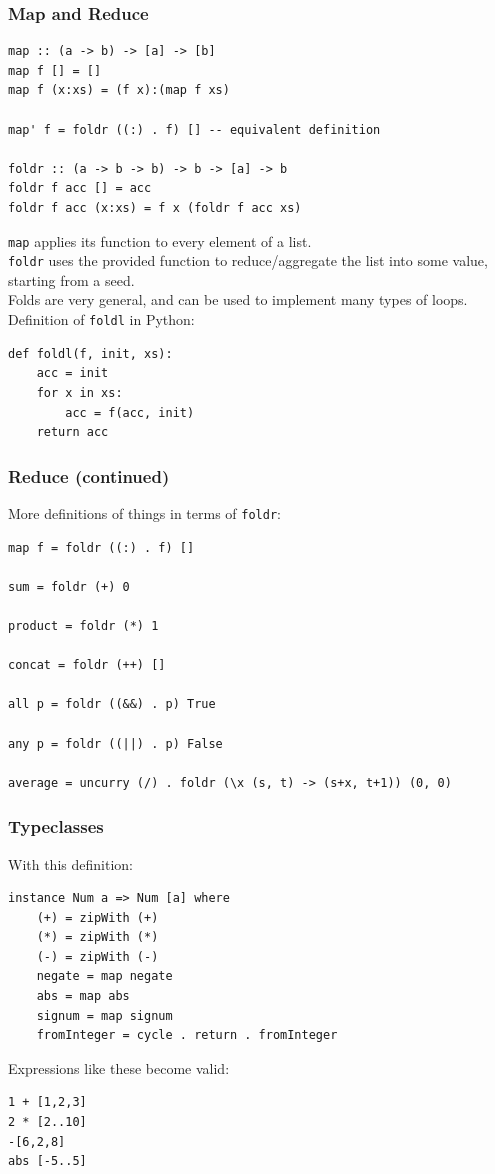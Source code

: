 \documentclass{beamer}
\begin{document}
\begin{frame}[fragile]
\frametitle{Map and Reduce}
\begin{Verbatim}[frame=single, fontsize=\scriptsize]
map :: (a -> b) -> [a] -> [b]
map f [] = []
map f (x:xs) = (f x):(map f xs)

map' f = foldr ((:) . f) [] -- equivalent definition

foldr :: (a -> b -> b) -> b -> [a] -> b
foldr f acc [] = acc
foldr f acc (x:xs) = f x (foldr f acc xs)
\end{Verbatim}
\verb|map| applies its function to every element of a list.\\
\verb|foldr| uses the provided function to reduce/aggregate the list into some value, starting from a seed.\\
Folds are very general, and can be used to implement many types of loops.\\
Definition of \verb|foldl| in Python:
\begin{Verbatim}[frame=single, fontsize=\scriptsize]
def foldl(f, init, xs):
    acc = init
    for x in xs:
        acc = f(acc, init)
    return acc
\end{Verbatim}
\end{frame}

\begin{frame}[fragile]
\frametitle{Reduce (continued)}
More definitions of things in terms of \verb|foldr|:
\begin{Verbatim}[frame=single, fontsize=\scriptsize]
map f = foldr ((:) . f) []

sum = foldr (+) 0

product = foldr (*) 1

concat = foldr (++) []

all p = foldr ((&&) . p) True

any p = foldr ((||) . p) False

average = uncurry (/) . foldr (\x (s, t) -> (s+x, t+1)) (0, 0)
\end{Verbatim}
\end{frame}

\begin{frame}[fragile]
\frametitle{Typeclasses}
With this definition:
\begin{Verbatim}[frame=single, fontsize=\scriptsize]
instance Num a => Num [a] where
    (+) = zipWith (+)
    (*) = zipWith (*)
    (-) = zipWith (-)
    negate = map negate
    abs = map abs
    signum = map signum
    fromInteger = cycle . return . fromInteger
\end{Verbatim}
Expressions like these become valid:
\begin{Verbatim}[frame=single, fontsize=\scriptsize]
1 + [1,2,3]
2 * [2..10]
-[6,2,8]
abs [-5..5]
\end{Verbatim}
\end{frame}
\end{document}
